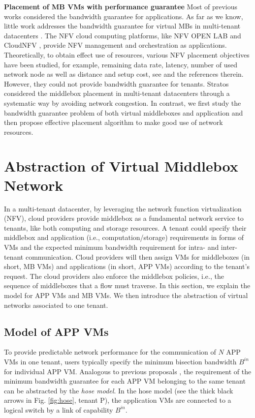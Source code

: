 \documentclass[review]{elsarticle}
\begin{document}
\textbf{Placement of MB VMs with performance guarantee}
Most of previous works considered the bandwidth guarantee for applications. As far as we know, little work addresses the bandwidth guarantee for virtual MBs in multi-tenant datacenters \cite{7243304}. The NFV cloud computing platforms, like NFV OPEN LAB \cite{HuaweiNFV} and CloudNFV \cite{CloudNFV}, provide NFV management and orchestration as applications. Theoretically, to obtain effect use of resources, various NFV placement objectives have been studied, for example, remaining data rate, latency, number of used network node as well as distance and setup cost, see \cite{M14sap, cohen2015near} and the references therein. However, they could not provide bandwidth guarantee for tenants. Stratos \cite{stratos12} considered the middlebox placement in multi-tenant datacenters through a systematic way by avoiding network congestion. In contrast, we first study the bandwidth guarantee
 problem of both virtual middleboxes and application and then propose effective placement algorithm to make good use of network resources.

\section{Abstraction of Virtual Middlebox Network}\label{sec:abstraction}
In a multi-tenant datacenter, by leveraging the network function virtualization (NFV), cloud providers provide middlebox as a fundamental network service to tenants, like both computing and storage resources. A tenant could specify their middlebox and application (i.e., computation/storage) requirements in forms of VMs and the expected minimum bandwidth requirement for intra- and inter-tenant communication. Cloud providers will then assign VMs for middleboxes (in short, MB VMs) and applications (in short, APP VMs) according to the tenant's request. The cloud providers also enforce the middlebox policies, i.e., the sequence of middleboxes that a flow must traverse. In this section, we explain the model for APP VMs and MB VMs. We then introduce the abstraction of virtual networks associated to one tenant.


\subsection{Model of APP VMs}
To provide predictable network performance for the communication of $N$ APP VMs in one tenant, users typically specify the minimum bisection bandwidth $B^{in}$ for individual APP VM. Analogous to previous proposals \cite{B13cta, P12fst}, the requirement of the minimum bandwidth guarantee for each APP VM belonging to the same tenant can be abstracted by the \emph{hose model}. In the hose model (see the thick black arrows in Fig. \ref{fig:hose}, tenant P), the application VMs are connected to a logical switch by a link of capability $B^{in}$.
\end{document}
